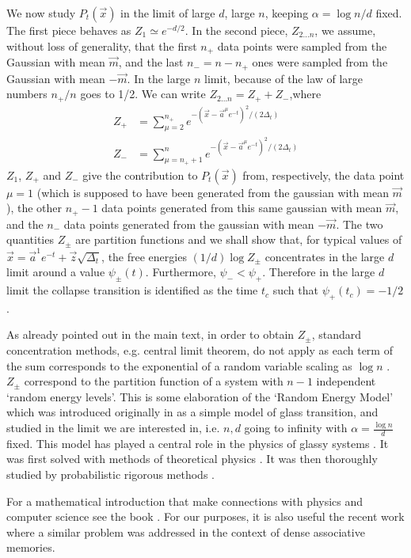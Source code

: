 \documentclass[10pt,twocolumn]{article}
\newcommand{\vx}{\vec x}
\newcommand{\va}{\vec a}
\begin{document}
We now study $P_t(\vx)$ in the limit of large $d$, large $n$, keeping $\alpha=\log n/d$ fixed. The first piece behaves as $Z_1\simeq e^{-d/2}$. In the second piece, $Z_{2...n}$,
we assume, without loss of generality, that the first $n_+$ data points were sampled from the Gaussian  with mean $\vec m$, and the last $n_-=n-n_+$ ones were sampled from the Gaussian  with mean $-\vec m$. In the large $n$ limit, because of the law of large numbers $n_+/n$ goes to 1/2.
We can write $Z_{2...n}=Z_++Z_- $,where
\begin{align}
Z_+&= \sum_{\mu=2}^{n_+} e^{-(\vx-\va^\mu e^{-t})^2/(2\Delta_t)} \\
Z_-&= \sum_{\mu=n_++1}^{n} e^{-(\vx-\va^\mu e^{-t})^2/(2\Delta_t)}
\end{align}
$Z_1$, $Z_+$ and $Z_-$ give the contribution to $P_t(\vx)$ from, respectively, the data point $\mu=1$ (which is supposed to have been generated from the gaussian with mean $\vec m$), the other $n_+-1$ data points generated from this same gaussian with mean $\vec m$, and the $n_-$ data points generated from the gaussian with mean $-\vec m$. The two quantities $Z_\pm$ are partition functions and we shall show that, for typical values of 
$\vx=\va^1e^{-t}+\vec z\sqrt{\Delta_t}$, the free energies $(1/d)\log Z_\pm$ concentrates in the large $d$ limit around a value $\psi_\pm(t)$. Furthermore, $\psi_-<\psi_+$. Therefore in the large $d$ limit the collapse transition is identified as the time $t_c$ such that $\psi_+(t_c)=-1/2$.

As already pointed out in the main text, in order to obtain $Z_\pm$, standard concentration methods, e.g. central limit theorem, do not apply as each term of the sum corresponds to the exponential of a random variable scaling as $\log n$ \cite{ben2005limit}. $Z_\pm$ correspond to the partition function of a system with $n-1$ independent `random energy levels'.  This is some elaboration of the `Random Energy Model' which was introduced originally in \cite{derrida1981random} as a simple model of glass transition, and studied in the limit we are interested in, i.e. $n,d$ going to infinity with $\alpha=\frac{\log n}{d}$ fixed. This model has played a central role in the physics of glassy systems \cite{mezard1987spin}. It was first solved with methods of theoretical physics \cite{derrida1981random}. It was then thoroughly studied by probabilistic rigorous methods \cite{ruelle1987mathematical}. 

For a mathematical introduction that make connections with physics and computer science see the book \cite{mezard2009information}. For our purposes, it is also useful the recent work \cite{lucibello2023exponential} where a similar problem was addressed in the context of dense associative memories.
\end{document}
